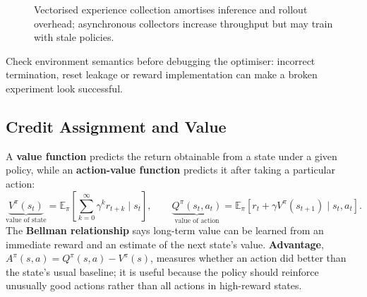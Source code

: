 \begin{figure}[!htbp]\centering
{}
\caption{Vectorised experience collection amortises inference and rollout overhead; asynchronous collectors increase throughput but may train with stale policies.}
\end{figure}
\begin{calloutpracticaltip}
Check environment semantics before debugging the optimiser: incorrect termination, reset leakage or reward implementation can make a broken experiment look successful.
\end{calloutpracticaltip}

\subsection{Credit Assignment and Value}\label{sec:rl-value}
A \textbf{value function} predicts the return obtainable from a state under a given policy, while an \textbf{action-value function} predicts it after taking a particular action:
\[
\underbrace{V^{\pi}(s_t)}_{\text{value of state}}
=\mathbb E_{\pi}\!\left[\sum_{k=0}^{\infty}\gamma^k r_{t+k}\mid s_t\right],\qquad
\underbrace{Q^{\pi}(s_t,a_t)}_{\text{value of action}}
=\mathbb E_{\pi}\!\left[r_t+\gamma V^{\pi}(s_{t+1})\mid s_t,a_t\right].
\]
The \textbf{Bellman relationship} says long-term value can be learned from an immediate reward and an estimate of the next state's value.
\textbf{Advantage}, $A^{\pi}(s,a)=Q^{\pi}(s,a)-V^{\pi}(s)$, measures whether an action did better than the state's usual baseline; it is useful because the policy should reinforce unusually good actions rather than all actions in high-reward states.

